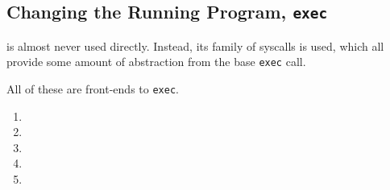 \subsection{Changing the Running Program, \texttt{exec}}\label{subsec:Change_Running_Program-exec}
 is almost never used directly.
Instead, its family of syscalls is used, which all provide some amount of abstraction from the base \texttt{exec} call.

All of these are front-ends to \texttt{exec}.
\begin{enumerate}[noitemsep]
\item {}
\item {}
\item {}
\item {}
\item {}
\end{enumerate}



